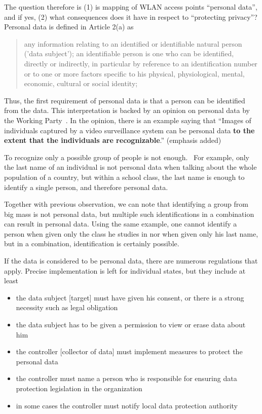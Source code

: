 \documentclass[12pt,a4paper,oneside,pdftex]{report}
\begin{document}
The question therefore is (1) is mapping of WLAN access points ``personal data'', and if yes, (2) what consequences does it have in respect to ``protecting privacy''? Personal data is defined in Article 2(a) as

\begin{quote}
    any information relating to an identified or identifiable natural person ('data subject'); an identifiable person is one who can be identified, directly or indirectly, in particular by reference to an identification number or to one or more factors specific to his physical, physiological, mental, economic, cultural or social identity;
\end{quote}

Thus, the first requirement of personal data is that a person can be identified from the data. This interpretation is backed by an opinion on personal data by the Working Party~\cite{wp29_136}. In the opinion, there is an example saying that ``Images of individuals captured by a video surveillance system can be personal data \textbf{to the extent that the individuals are recognizable}.'' (emphasis added)

To recognize only a possible group of people is not enough.~\cite{wp29_136} For example, only the last name of an individual is not personal data when talking about the whole population of a country, but within a school class, the last name is enough to identify a single person, and therefore personal data.

Together with previous observation, we can note that identifying a group from big mass is not personal data, but multiple such identifications in a combination can result in personal data. Using the same example, one cannot identify a person when given only the class he studies in nor when given only his last name, but in a combination, identification is certainly possible.

If the data is considered to be personal data, there are numerous regulations that apply. Precise implementation is left for individual states, but they include at least
\begin{itemize}
    \item the data subject [target] must have given his consent, or there is a strong necessity such as legal obligation
    \item the data subject has to be given a permission to view or erase data about him
    \item the controller [collector of data] must implement measures to protect the personal data
    \item the controller must name a person who is responsible for ensuring data protection legislation in the organization
    \item in some cases the controller must notify local data protection authority
\end{itemize}
\end{document}
